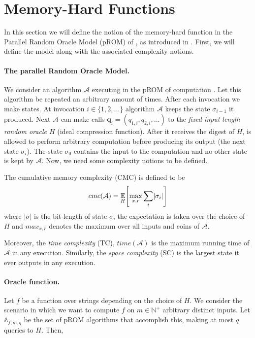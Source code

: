 \section{Memory-Hard Functions}
In this section we will define the notion of the memory-hard function in the Parallel Random Oracle Model (pROM) of \cite{Alwen:2015:HPC:2746539.2746622}, as introduced in \cite{cryptoeprint:2016:875}. First, we will define the model along with the associated complexity notions.

\paragraph{The parallel Random Oracle Model.} We consider an algorithm $\mathcal{A}$ executing in the pROM of computation \cite{Alwen:2015:HPC:2746539.2746622}. Let this algorithm be repeated an arbitrary amount of times. After each invocation we make states. At invocation $i \in \{ 1,2, \dots \}$ algorithm $\mathcal{A}$ keeps the state $\sigma_{i-1}$ it produced. Next $\mathcal{A}$ can make calls $\textbf{q}_i = (q_{1,i}, q_{2,i}, \dots)$
to the \textit{fixed input length random oracle $H$} (ideal compression function). After it receives the digest of $H$, is allowed to perform arbitrary computation before producing its output (the next state $\sigma_i$). The state $\sigma_0$ contains the input to the computation and no other state is kept by $\mathcal{A}$. Now, we need some complexity notions to be defined.

The cumulative memory complexity (CMC) is defined to be
\begin{equation}
    cmc(\mathcal{A}) = \underset{H}{\mathbb{E}} \Bigg{[} \underset{x,r}{\max} \sum_{i} \lvert \sigma_i \rvert \Bigg{]}
\end{equation}
where $\lvert \sigma \rvert$ is the bit-length of state $\sigma$, the expectation is taken over the choice of $H$ and $max_{x,r}$ denotes the maximum over all inputs and coins of $\mathcal{A}$.

Moreover, the \textit{time complexity} (TC), $time(\mathcal{A})$ is the maximum running time of $\mathcal{A}$ in any execution. Similarly, the \textit{space complexity} (SC) is the largest state it ever outputs in any execution.

\paragraph{Oracle function.} Let $f$ be a function over strings depending on the choice of $H$. We consider the scenario in which we want to compute $f$ on $m \in \mathbb{N}^{+}$ arbitrary distinct inputs.
Let $\mathbb{A}_{f,m,q}$ be the set of pROM algorithms that accomplish this, making at most $q$ queries to
$H$. Then,

